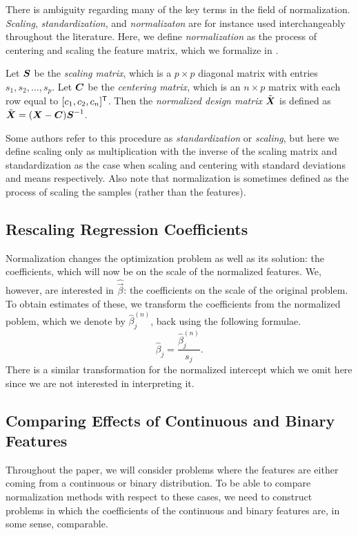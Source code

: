 There is ambiguity regarding many of the key terms in the field of normalization. \emph{Scaling}, \emph{standardization}, and \emph{normalizaton} are for instance used interchangeably throughout the literature. Here, we define \emph{normalization} as the process of centering and scaling the feature matrix, which we formalize in .

\begin{definition}[Normalization]
  \label{def:normalization}
  Let \(\boldsymbol S\) be the \emph{scaling matrix}, which is a \(p \times p\) diagonal matrix with entries \(s_1, s_2, \dots, s_p\). Let \(\boldsymbol C\) be the \emph{centering matrix}, which is an \(n \times p\) matrix with each row equal to \([c_1, c_2, c_n]^{\mathsf{T}}\). Then the \emph{normalized design matrix} \(\tilde{\boldsymbol X}\) is defined as \(\tilde{\boldsymbol X} = (\boldsymbol X - \boldsymbol C)\boldsymbol S^{-1}\).
\end{definition}

Some authors refer to this procedure as \emph{standardization} or \emph{scaling}, but here we define scaling only as multiplication with the inverse of the scaling matrix and standardization as the case when scaling and centering with standard deviations and means respectively. Also note that normalization is sometimes defined as the process of scaling the samples (rather than the features).

\subsection{Rescaling Regression Coefficients}

Normalization changes the optimization problem as well as its solution: the coefficients, which will now be on the scale of the normalized features. We, however, are interested in \(\hat{\vec{\beta}}\): the coefficients on the scale of the original problem. To obtain estimates of these, we transform the coefficients from the normalized poblem, which we denote by \(\hat\beta^{(n)}_j\), back using the following formulae.
\[
  \hat\beta_j = \frac{\hat\beta^{(n)}_j}{s_j}.
\]
There is a similar transformation for the normalized intercept which we omit here since we are not interested in interpreting it.

\subsection{Comparing Effects of Continuous and Binary Features}

Throughout the paper, we will consider problems where the features are either coming from a continuous or binary distribution. To be able to compare normalization methods with respect to these cases, we need to construct problems in which the coefficients of the continuous and binary features are, in some sense, comparable.


